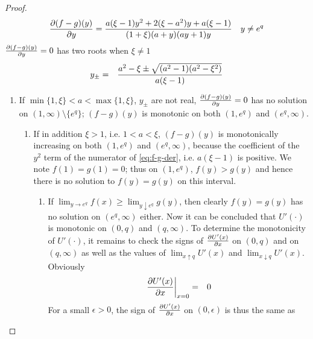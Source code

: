 \documentclass[11pt,a4]{amsart}
\newcommand{\pd}{\partial}
\newcommand{\1}{{\mathbf 1}}
\begin{document}
\begin{proof}
  \begin{equation}
    \label{eq:f-g-der}
    {\pd (f -g)(y) \over \pd y} = {
      a (\xi - 1) y^2 + 2 (\xi - a^2) y + a(\xi - 1)
      \over
      (1 + \xi) (a + y) (a y + 1) y
    }
    \quad
    y \neq e^q
  \end{equation}
  ${\pd (f -g)(y) \over \pd y} = 0$ has two roots when $\xi \ne 1$
  \begin{eqnarray*}
    y_\pm &=& {
      a^2 - \xi \pm \sqrt{(a^2 - 1) (a^2 - \xi^2)}
      \over
      a (\xi - 1)
    }
  \end{eqnarray*}
  \begin{enumerate}
  \item If $\min\{1, \xi\} < a < \max\{1, \xi\}$, $y_\pm$ are not
    real, ${\pd (f -g)(y) \over \pd y} = 0$ has no solution on $(1,
    \infty)\setminus \{e^q\}$; $(f -g)(y)$ is monotonic on both
    $(1, e^q)$ and $(e^q, \infty)$.
    \begin{enumerate}
    \item If in addition $\xi > 1$, i.e. $1 < a < \xi$, $(f - g)(y)$
      is monotonically increasing on both
      $(1, e^q)$ and $(e^q, \infty)$, because the coefficient of the
      $y^2$ term of the numerator of \eqref{eq:f-g-der}, i.e. $a (\xi
      - 1)$ is positive. We note $f(1) = g(1) = 0$; thus on $(1, e^q)$,
      $f(y) > g(y)$ and hence there is no solution to $f(y) = g(y)$ on
      this interval.
      \begin{enumerate}
      \item If $ \lim_{y \to e^q}f(x) \ge \lim_{y \downarrow e^q} g(y)$,
        then clearly $f(y) = g(y)$ has no
        solution on $(e^q, \infty)$ either.
        Now it can be concluded that $U'(\cdot)$ is monotonic on
        $(0, q)$ and $(q, \infty)$. To determine the monotonicity of
        $U'(\cdot)$, it remains to check the signs of
        ${\pd U'(x) \over \pd x}$  on  $(0, q)$ and on $(q, \infty)$
        as well as the values of $\lim_{x \uparrow q} U'(x)$ and
        $\lim_{x \downarrow q} U'(x)$. Obviously
        \begin{eqnarray*}
          \left.{\pd U'(x) \over \pd x}\right|_{x=0} &=& 0 \\
        \end{eqnarray*}
        For a small $\epsilon > 0$, the sign of ${\pd U'(x) \over \pd
          x}$ on $(0, \epsilon)$ is thus the same as

\end{enumerate}
\end{enumerate}
\end{enumerate}
\end{proof}
\end{document}
